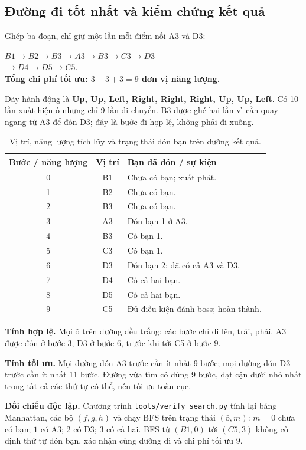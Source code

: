 \clearpage
\subsection{Đường đi tốt nhất và kiểm chứng kết quả}

Ghép ba đoạn, chỉ giữ một lần mỗi điểm nối A3 và D3:
\begin{calloutnote}
    \centering
    $B1\to B2\to B3\to A3\to B3\to C3\to D3$\\
    $\to D4\to D5\to C5$.\\[3pt]
    \textbf{Tổng chi phí tối ưu: $3+3+3=9$ đơn vị năng lượng.}
\end{calloutnote}

Dãy hành động là \textbf{Up, Up, Left, Right, Right, Right, Up, Up, Left}. Có 10 lần xuất hiện ô nhưng chỉ 9 lần di chuyển. B3 được ghé hai lần vì cần quay ngang từ A3 để đón D3; đây là bước đi hợp lệ, không phải đi xuống.

\begin{table}[ht!]
    \centering
    \caption{Vị trí, năng lượng tích lũy và trạng thái đón bạn trên đường kết quả.}
    \renewcommand{\arraystretch}{1.2}
    \begin{tabularx}{\textwidth}{c c X}
        \toprule
        \textbf{Bước / năng lượng} & \textbf{Vị trí} & \textbf{Bạn đã đón / sự kiện} \\
        \midrule
        0 & B1 & Chưa có bạn; xuất phát. \\
        1 & B2 & Chưa có bạn. \\
        2 & B3 & Chưa có bạn. \\
        3 & A3 & Đón bạn 1 ở A3. \\
        4 & B3 & Có bạn 1. \\
        5 & C3 & Có bạn 1. \\
        6 & D3 & Đón bạn 2; đã có cả A3 và D3. \\
        7 & D4 & Có cả hai bạn. \\
        8 & D5 & Có cả hai bạn. \\
        9 & C5 & Đủ điều kiện đánh boss; hoàn thành. \\
        \bottomrule
    \end{tabularx}
\end{table}

\textbf{Tính hợp lệ.} Mọi ô trên đường đều trắng; các bước chỉ đi lên, trái, phải. A3 được đón ở bước 3, D3 ở bước 6, trước khi tới C5 ở bước 9.

\textbf{Tính tối ưu.} Mọi đường đón A3 trước cần ít nhất 9 bước; mọi đường đón D3 trước cần ít nhất 11 bước. Đường vừa tìm có đúng 9 bước, đạt cận dưới nhỏ nhất trong tất cả các thứ tự có thể, nên tối ưu toàn cục.

\textbf{Đối chiếu độc lập.} Chương trình \texttt{tools/verify\_search.py} tính lại bảng Manhattan, các bộ $(f,g,h)$ và chạy BFS trên trạng thái $(\text{ô},m)$: $m=0$ chưa có bạn; $1$ có A3; $2$ có D3; $3$ có cả hai. BFS từ $(B1,0)$ tới $(C5,3)$ không cố định thứ tự đón bạn, xác nhận cùng đường đi và chi phí tối ưu 9.

